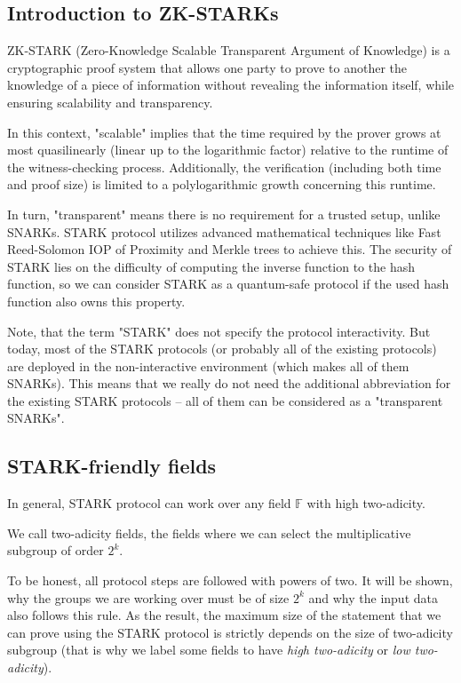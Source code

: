 \documentclass[../lecture-notes.tex]{subfiles}
\begin{document}
\subsection{Introduction to ZK-STARKs}

ZK-STARK (Zero-Knowledge Scalable Transparent Argument of Knowledge) is a cryptographic proof system that allows one party to prove to another the knowledge of a piece of information without revealing the information itself, while ensuring scalability and transparency. 

In this context, "scalable" implies that the time required by the prover grows at most quasilinearly (linear up to the logarithmic factor) relative to the runtime of the witness-checking process. Additionally, the verification (including both time and proof size) is limited to a polylogarithmic growth concerning this runtime.

In turn, "transparent" means there is no requirement for a trusted setup, unlike SNARKs. STARK protocol utilizes advanced mathematical techniques like Fast Reed-Solomon IOP of Proximity and Merkle trees to achieve this. The security of STARK lies on the difficulty of computing the inverse function to the hash function, so we can consider STARK as a quantum-safe protocol if the used hash function also owns this property.

Note, that the term "STARK" does not specify the protocol interactivity. But today, most of the STARK protocols (or probably all of the existing protocols) are deployed in the non-interactive environment (which makes all of them SNARKs). This means that we really do not need the additional abbreviation for the existing STARK protocols -- all of them can be considered as a "transparent SNARKs".

\subsection{STARK-friendly fields}
In general, STARK protocol can work over any field $\mathbb{F}$ with high two-adicity.

\begin{definition}
    We call two-adicity fields, the fields where we can select the multiplicative subgroup of order $2^k$.
\end{definition}

To be honest, all protocol steps are followed with powers of two. It will be shown, why the groups we are working over must be of size $2^k$ and why the input data also follows this rule. As the result, the maximum size of the statement that we can prove using the STARK protocol is strictly depends on the size of two-adicity subgroup (that is why we label some fields to have \textit{high two-adicity} or \textit{low two-adicity}).
\end{document}
